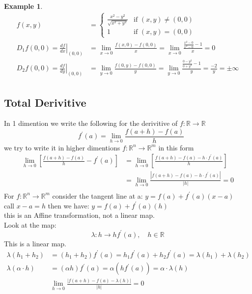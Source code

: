 \documentclass[12pt]{article}
\def\RR{\mathbb{R}}
\newtheorem{example}{Example}[section]
\begin{document}
\begin{example}
\begin{align*}
 f(x,y) &=
  \begin{cases}
   \frac{x^{2} - y^{2}}{\sqrt{x^{2} + y^{2}}} & \text{if } (x,y) \neq (0,0) \\
   1       & \text{if } (x,y) = (0,0)
  \end{cases}\\
 D_{1}f(0,0) =\left.\frac{df}{dx}\right| _{(0,0)} &=  \lim_{x \to 0}\frac{f(x,0) - f(0,0)}{x}= \lim_{x \to 0}\frac{\frac{x^{2}-0}{x^{2}-0} -1}{x} = 0\\
D_{2}f(0,0) =\left.\frac{df}{dy}\right| _{(0,0)} &=  \lim_{y \to 0}\frac{f(0,y) - f(0,0)}{y}= \lim_{y \to 0}\frac{\frac{0-y^{2}}{0+y^{2}} -1}{y} = \frac{-2}{y}= \pm \infty\\
\end{align*}
\end{example}

\subsection{Total Derivitive}


In 1 dimention we write the following for the derivitive of $f:\RR \rightarrow \RR$
\[\quad f^{'}(a)=\lim_{h \to 0}\frac{f(a+h) - f(a)}{h}\]
we try to write it in higher dimentions $f:\RR^{n} \rightarrow \RR^{m}$ in this form
\begin{align*}
\lim_{h \to 0}\left[\frac{f(a+h) - f(a)}{h} - f^{'}(a)\right] &=\lim_{h \to 0}\left[\frac{f(a+h) - f(a) - h \cdot f^{'}(a)}{h}\right]\\
&=\lim_{h \to 0}\frac{|f(a+h) - f(a) - h \cdot f^{'}(a)|}{|h|} =0 \\
\end{align*}
For $f:\RR^{n} \rightarrow \RR^{m}$ consider the tangent line at a: $y=f(a) +f^{'}(a)(x-a)$\\
call $x-a = h$ then we have: $y=f(a) +f^{'}(a)(h)$\\
this is an Affine transformation, not a linear map.\\
Look at the map:
\[\lambda:h \rightarrow hf^{'}(a), \quad h \in \RR\]
This is a linear map.
\begin{align*}
\lambda(h_{1} + h_{2})&=(h_{1} + h_{2})f^{'}(a)= h_{1}f^{'}(a) + h_{2}f^{'}(a) =\lambda(h_{1}) + \lambda(h_{2})\\
\lambda(\alpha \cdot h)&=(\alpha h)f^{'}(a)=\alpha(hf^{'}(a))=\alpha \cdot\lambda( h)\\
&\lim_{h \to 0}\frac{|f(a+h) - f(a) - \lambda(h)|}{|h|} =0 \\
\end{align*}
\end{document}
